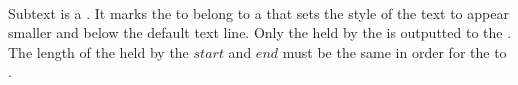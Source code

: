  \\

Subtext is a . It marks the  to belong to a  that sets the style of the text to appear smaller and below the default text line. Only the  held by the  is outputted to the . The length of the  held by the \inline$start$ and \inline$end$  must be the same in order for the   to .\\

\begin{examples}
\end{examples}

